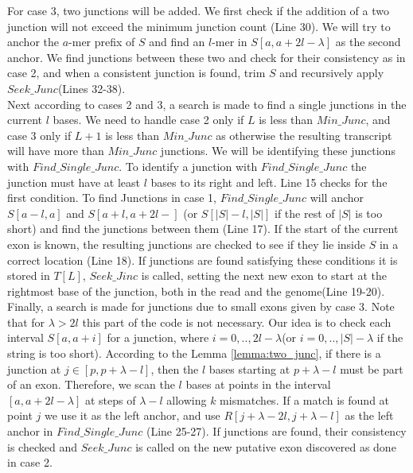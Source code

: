 \documentclass{article}
\begin{document}
For case 3, two junctions will be added. We first check if the addition of a two junction will not exceed the minimum junction count (Line 30). We will try to anchor the $a$-mer prefix of $S$ and find an $l$-mer in $S[a,a+2l-\lambda]$ as the second anchor. We find junctions between these two and check for their consistency as in case 2, and when a consistent junction is found, trim $S$ and recursively apply $Seek\_Junc$(Lines 32-38).\\   




Next according to cases 2 and 3, a search is made to find a single junctions in the current $l$ bases. We need to handle case 2 only if $L$ is less than $Min\_Junc$, and case 3 only if $L+1$ is less than $Min\_Junc$ as otherwise the resulting transcript will have more than $Min\_Junc$ junctions. We will be identifying these junctions with $Find\_Single\_Junc$. To identify a junction with $Find\_Single\_Junc$ the junction must have at least $l$ bases to its right and left. Line 15 checks for the first condition. To find Junctions in case 1, $Find\_Single\_Junc$ will anchor $S[a-l,a]$ and $S[a+l,a+2l-]$ (or $S[|S|-l,|S|]$ if the rest of $|S|$ is too short) and find the junctions between them (Line 17). If the start of the current exon is known, the resulting junctions are checked to see if they lie inside $S$ in a correct location (Line 18). If junctions are found satisfying these conditions it is stored in $T[L]$, $Seek\_Jinc$ is called, setting the next new exon to start at the rightmost base of the junction, both in the read and the genome(Line 19-20).\\

Finally, a search is made for junctions due to small exons given by case 3. Note that for $\lambda>2l$ this part of the code is not necessary.  Our idea is to check each interval $S[a,a+i]$ for a junction, where $i=0,..,2l-\lambda$(or $i=0,..,|S|-\lambda$ if the string is too short). According to the Lemma \ref{lemma:two_junc}, if there is a junction at $j\in [p,p+\lambda-l]$, then the $l$ bases starting at $p+\lambda-l$ must be part of an exon. Therefore, we scan the $l$ bases at points in the interval $[a,a+2l-\lambda]$ at steps of $\lambda-l$ allowing $k$ mismatches. If a match is found at point $j$ we use it as the left anchor, and use $R[j+\lambda-2l,j+\lambda-l]$ as the left anchor in $Find\_Single\_Junc$ (Line 25-27). If junctions are found, their consistency is checked and $Seek\_Junc$ is called on the new putative exon discovered as done in case 2.\\
\end{document}
